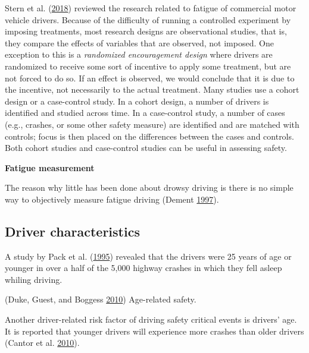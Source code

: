 \documentclass[12pt]{book}
\numberwithin{equation}{chapter}
\begin{document}
Stern et al. (\protect\hyperlink{ref-stern2018data}{2018}) reviewed the research related to fatigue of commercial motor vehicle drivers. Because of the difficulty of running a controlled experiment by imposing treatments, most research designs are observational studies, that is, they compare the effects of variables that are observed, not imposed. One exception to this is a \emph{randomized encouragement design} where drivers are randomized to receive some sort of incentive to apply some treatment, but are not forced to do so. If an effect is observed, we would conclude that it is due to the incentive, not necessarily to the actual treatment. Many studies use a cohort design or a case-control study. In a cohort design, a number of drivers is identified and studied across time. In a case-control study, a number of cases (e.g., crashes, or some other safety measure) are identified and are matched with controls; focus is then placed on the differences between the cases and controls. Both cohort studies and case-control studies can be useful in assessing safety.

\textbf{Fatigue measurement}

The reason why little has been done about drowsy driving is there is no simple way to objectively measure fatigue driving (Dement \protect\hyperlink{ref-dement1997perils}{1997}).

\hypertarget{driver-characteristics}{%
\subsection{Driver characteristics}\label{driver-characteristics}}

A study by Pack et al. (\protect\hyperlink{ref-pack1995characteristics}{1995}) revealed that the drivers were 25 years of age or younger in over a half of the 5,000 highway crashes in which they fell asleep whiling driving.

(Duke, Guest, and Boggess \protect\hyperlink{ref-duke2010age}{2010}) Age-related safety.

Another driver-related risk factor of driving safety critical events is drivers' age. It is reported that younger drivers will experience more crashes than older drivers (Cantor et al. \protect\hyperlink{ref-cantor2010driver}{2010}).
\end{document}
